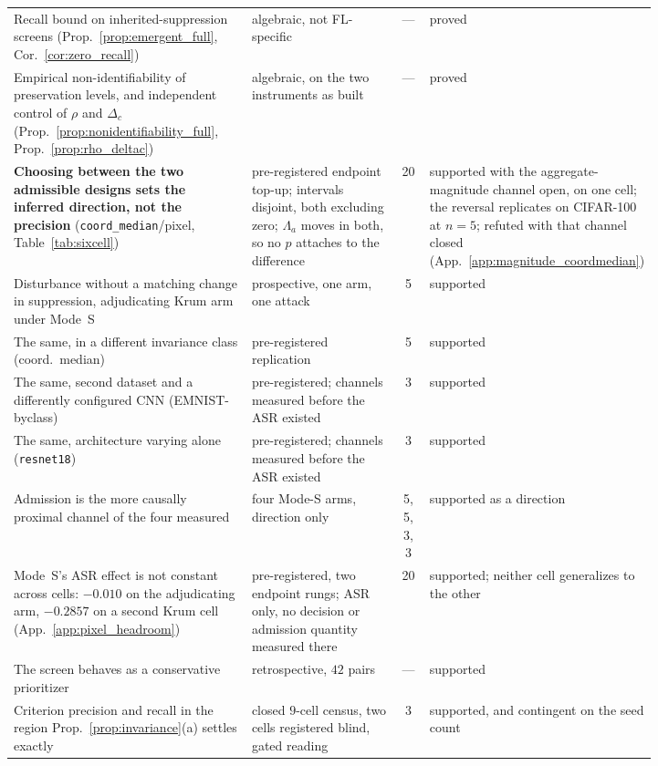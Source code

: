 \documentclass{article}
\begin{document}
\begin{table}[h]
\begin{tabular}{@{}p{0.375\linewidth}p{0.235\linewidth}cp{0.215\linewidth}@{}}
Recall bound on inherited-suppression screens (Prop.~\ref{prop:emergent_full}, Cor.~\ref{cor:zero_recall}) & algebraic, not FL-specific & --- & proved \\
Empirical non-identifiability of preservation levels, and independent control of $\rho$ and $\Delta_c$ (Prop.~\ref{prop:nonidentifiability_full}, Prop.~\ref{prop:rho_deltac}) & algebraic, on the two instruments as built & --- & proved \\
\midrule
\textbf{Choosing between the two admissible designs sets the inferred direction, not the precision} (\texttt{coord\_median}/pixel, Table~\ref{tab:sixcell}) & pre-registered endpoint top-up; intervals disjoint, both excluding zero; $\Lambda_a$ moves in both, so no $p$ attaches to the difference & 20 & supported with the aggregate-magnitude channel open, on one cell; the reversal replicates on CIFAR-100 at $n{=}5$; refuted with that channel closed (App.~\ref{app:magnitude_coordmedian}) \\
Disturbance without a matching change in suppression, adjudicating Krum arm under Mode~S & prospective, one arm, one attack & 5 & supported \\
The same, in a different invariance class (coord.\ median) & pre-registered replication & 5 & supported \\
The same, second dataset and a differently configured CNN (EMNIST-byclass) & pre-registered; channels measured before the ASR existed & 3 & supported \\
The same, architecture varying alone (\texttt{resnet18}) & pre-registered; channels measured before the ASR existed & 3 & supported \\
Admission is the more causally proximal channel of the four measured & four Mode-S arms, direction only & 5, 5, 3, 3 & supported as a direction \\
Mode~S's ASR effect is not constant across cells: $-0.010$ on the adjudicating arm, $-0.2857$ on a second Krum cell (App.~\ref{app:pixel_headroom}) & pre-registered, two endpoint rungs; ASR only, no decision or admission quantity measured there & 20 & supported; neither cell generalizes to the other \\
The screen behaves as a conservative prioritizer & retrospective, $42$ pairs & --- & supported \\
Criterion precision and recall in the region Prop.~\ref{prop:invariance}(a) settles exactly & closed $9$-cell census, two cells registered blind, gated reading & 3 & supported, and contingent on the seed count \\

\end{tabular}
\end{table}
\end{document}
